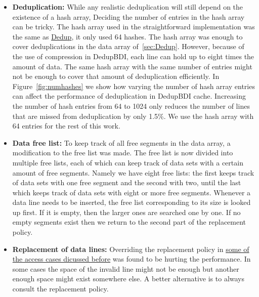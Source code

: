 \begin{itemize}
    \item \textbf{Deduplication:} While any realistic deduplication will still depend on the existence of a hash array, Deciding the number of entries in the hash array can be tricky. The hash array used in the straightforward implementation was the same as \hyperref[sssec:DedupHash]{Dedup}, it only used 64 hashes. The hash array was enough to cover deduplications in the data array of~\ref{sec:Dedup}. However, because of the use of compression in DedupBDI, each line can hold up to eight times the amount of data. The same hash array with the same number of entries might not be enough to cover that amount of deduplication efficiently. In Figure~\ref{fig:numhashes} we show how varying the number of hash array entries can affect the performance of deduplication in DedupBDI cache. Increasing the number of hash entries from 64 to 1024 only reduces the number of lines that are missed from deduplication by only 1.5\%. We use the hash array with 64 entries for the rest of this work.
    \item \textbf{Data free list:} To keep track of all free segments in the data array, a modification to the free list was made. The free list is now divided into multiple free lists, each of which can keep track of data sets with a certain amount of free segments. Namely we have eight free lists: the first keeps track of data sets with one free segment and the second with two, until the last which keeps track of data sets with eight or more free segments. Whenever a data line needs to be inserted, the free list corresponding to its size is looked up first. If it is empty, then the larger ones are searched one by one. If no empty segments exist then we return to the second part of the replacement policy.
    \item \textbf{Replacement of data lines:} Overriding the replacement policy in \hyperref[itm:override]{some of the access cases dicussed before} was found to be hurting the performance. In some cases the space of the invalid line might not be enough but another enough space might exist somewhere else. A better alternative is to always consult the replacement policy. 
\end{itemize}
